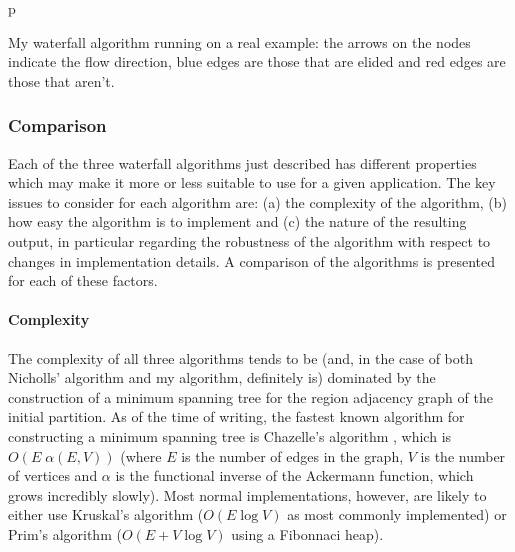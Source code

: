 \begin{stusubfig}{p}
\caption{My waterfall algorithm running on a real example: the arrows on the nodes indicate the flow direction, blue edges are those that are elided and red edges are those that aren't.}
\label{fig:segmentation-waterfall-smg-example}
\end{stusubfig}

\subsubsection{Comparison}

Each of the three waterfall algorithms just described has different properties which may make it more or less suitable to use for a given application. The key issues to consider for each algorithm are: (a) the complexity of the algorithm, (b) how easy the algorithm is to implement and (c) the nature of the resulting output, in particular regarding the robustness of the algorithm with respect to changes in implementation details. A comparison of the algorithms is presented for each of these factors.

\paragraph{Complexity}

The complexity of all three algorithms tends to be (and, in the case of both Nicholls' algorithm and my algorithm, definitely is) dominated by the construction of a minimum spanning tree for the region adjacency graph of the initial partition. As of the time of writing, the fastest known algorithm for constructing a minimum spanning tree is Chazelle's algorithm \cite{?}, which is $O(E \; \alpha(E,V))$ (where $E$ is the number of edges in the graph, $V$ is the number of vertices and $\alpha$ is the functional inverse of the Ackermann function, which grows incredibly slowly). Most normal implementations, however, are likely to either use Kruskal's algorithm ($O(E \log V)$ as most commonly implemented) or Prim's algorithm ($O(E + V \log V)$ using a Fibonnaci heap).

